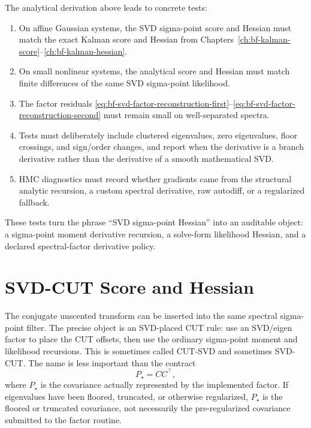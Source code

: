 The analytical derivation above leads to concrete tests:
\begin{enumerate}[label=(\roman*)]
  \item On affine Gaussian systems, the SVD sigma-point score and Hessian must
    match the exact Kalman score and Hessian from
    Chapters~\ref{ch:bf-kalman-score}--\ref{ch:bf-kalman-hessian}.
  \item On small nonlinear systems, the analytical score and Hessian must match
    finite differences of the same SVD sigma-point likelihood.
  \item The factor residuals
    \eqref{eq:bf-svd-factor-reconstruction-first}--\eqref{eq:bf-svd-factor-reconstruction-second}
    must remain small on well-separated spectra.
  \item Tests must deliberately include clustered eigenvalues, zero eigenvalues,
    floor crossings, and sign/order changes, and report when the derivative is a
    branch derivative rather than the derivative of a smooth mathematical SVD.
  \item HMC diagnostics must record whether gradients came from the structural
    analytic recursion, a custom spectral derivative, raw autodiff, or a
    regularized fallback.
\end{enumerate}
These tests turn the phrase ``SVD sigma-point Hessian'' into an auditable object:
a sigma-point moment derivative recursion, a solve-form likelihood Hessian, and
a declared spectral-factor derivative policy.

\section{SVD-CUT Score and Hessian}
\label{sec:bf-cut-svd-score-hessian}

The conjugate unscented transform can be inserted into the same spectral
sigma-point filter.  The precise object is an SVD-placed CUT rule: use an
SVD/eigen factor to place the CUT offsets, then use the ordinary sigma-point
moment and likelihood recursions.  This is sometimes called CUT-SVD and
sometimes SVD-CUT.  The name is less important than the contract
\[
  P_\star=C C^\top ,
\]
where $P_\star$ is the covariance actually represented by the implemented
factor.  If eigenvalues have been floored, truncated, or otherwise regularized,
$P_\star$ is the floored or truncated covariance, not necessarily the
pre-regularized covariance submitted to the factor routine.

